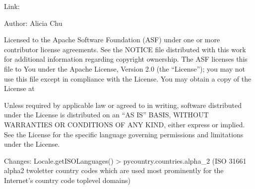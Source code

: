\documentclass[letterpaper,10pt,english]{sphinxmanual}
\begin{document}
\sphinxAtStartPar
Link: 

\sphinxAtStartPar
Author: Alicia Chu
\begin{description}
\sphinxAtStartPar
Licensed to the Apache Software Foundation (ASF) under one or more contributor license agreements.
See the NOTICE file distributed with this work for additional information regarding copyright ownership.
The ASF licenses this file to You under the Apache License, Version 2.0 (the “License”);
you may not use this file except in compliance with the License. You may obtain a copy of the License at

\sphinxAtStartPar
{}

\sphinxAtStartPar
Unless required by applicable law or agreed to in writing, software distributed under the License is
distributed on an “AS IS” BASIS, WITHOUT WARRANTIES OR CONDITIONS OF ANY KIND, either express or implied.
See the License for the specific language governing permissions and limitations under the License.

\end{description}

\sphinxAtStartPar
Changes:
\sphinxhyphen{} Locale.getISOLanguages() \sphinxhyphen{}\textgreater{} pycountry.countries.alpha\_2 (ISO 3166\sphinxhyphen{}1 alpha\sphinxhyphen{}2 \textendash{} two\sphinxhyphen{}letter country codes which are used most prominently for the Internet’s country code top\sphinxhyphen{}level domains)
\end{document}
